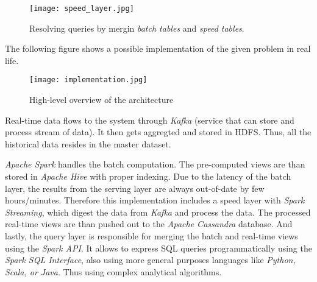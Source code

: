 \documentclass[format=acmsmall, review=false, screen=true]{acmart}
\begin{document}
\begin{figure}[H]
  \texttt{[image: speed\_layer.jpg]}
  \caption{Resolving queries by mergin \textit{batch tables} and \textit{speed tables}.}
  \label{fig:speed-layer}
\end{figure}

The following figure shows a possible implementation of the given problem in real life. 

\begin{figure}[H]
  \texttt{[image: implementation.jpg]}
  \caption{High-level overview of the architecture}
  \label{fig:speed-layer}
\end{figure}

Real-time data flows to the system through \textit{Kafka} (service that can store and process stream of data). It then gets aggregted and stored in HDFS. Thus, all the historical data resides in the master dataset.

\textit{Apache Spark} handles the batch computation. The pre-computed views are than stored in \textit{Apache Hive} with proper indexing. Due to the latency of the batch layer, the results from the serving layer are always out-of-date by few hours/minutes. Therefore this implementation includes a speed layer with \textit{Spark Streaming}, which digest the data from \textit{Kafka} and process the data. The processed real-time views are than pushed out to the \textit{Apache Cassandra} database. And lastly, the query layer is responsible for merging the batch and real-time views using the \textit{Spark API}. It allows to express SQL queries programmatically using the \textit{Spark SQL Interface}, also using more general purposes languages like \textit{Python, Scala, or Java}. Thus using complex analytical algorithms. 
\end{document}

